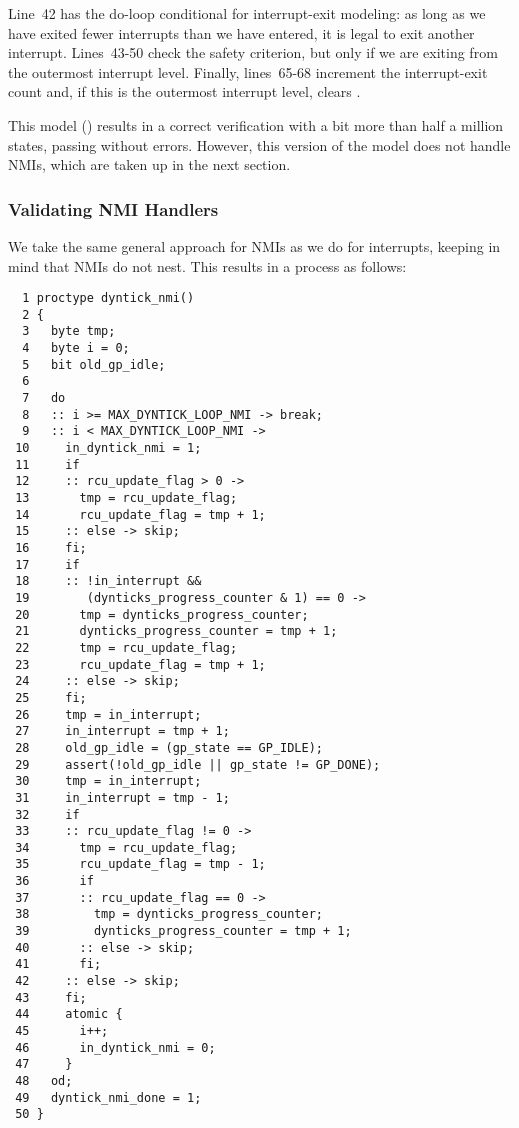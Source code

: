 Line~42 has the do-loop conditional for interrupt-exit modeling:
as long as we have exited fewer interrupts than we have entered, it is
legal to exit another interrupt.
Lines~43-50 check the safety criterion, but only if we are exiting
from the outermost interrupt level.
Finally, lines~65-68 increment the interrupt-exit count 
and, if this is the outermost interrupt level, clears
.

This model ()
results in a correct verification with a bit more than half a million
states, passing without errors.
However, this version of the model does not handle NMIs,
which are taken up in the next section.

\subsubsection{Validating NMI Handlers}
\label{sec:formal:Validating NMI Handlers}

We take the same general approach for NMIs as we do for interrupts,
keeping in mind that NMIs do not nest.
This results in a  process as follows:

{ \scriptsize
\begin{verbatim}
  1 proctype dyntick_nmi()
  2 {
  3   byte tmp;
  4   byte i = 0;
  5   bit old_gp_idle;
  6
  7   do
  8   :: i >= MAX_DYNTICK_LOOP_NMI -> break;
  9   :: i < MAX_DYNTICK_LOOP_NMI ->
 10     in_dyntick_nmi = 1;
 11     if
 12     :: rcu_update_flag > 0 ->
 13       tmp = rcu_update_flag;
 14       rcu_update_flag = tmp + 1;
 15     :: else -> skip;
 16     fi;
 17     if
 18     :: !in_interrupt &&
 19        (dynticks_progress_counter & 1) == 0 ->
 20       tmp = dynticks_progress_counter;
 21       dynticks_progress_counter = tmp + 1;
 22       tmp = rcu_update_flag;
 23       rcu_update_flag = tmp + 1;
 24     :: else -> skip;
 25     fi;
 26     tmp = in_interrupt;
 27     in_interrupt = tmp + 1;
 28     old_gp_idle = (gp_state == GP_IDLE);
 29     assert(!old_gp_idle || gp_state != GP_DONE);
 30     tmp = in_interrupt;
 31     in_interrupt = tmp - 1;
 32     if
 33     :: rcu_update_flag != 0 ->
 34       tmp = rcu_update_flag;
 35       rcu_update_flag = tmp - 1;
 36       if
 37       :: rcu_update_flag == 0 ->
 38         tmp = dynticks_progress_counter;
 39         dynticks_progress_counter = tmp + 1;
 40       :: else -> skip;
 41       fi;
 42     :: else -> skip;
 43     fi;
 44     atomic {
 45       i++;
 46       in_dyntick_nmi = 0;
 47     }
 48   od;
 49   dyntick_nmi_done = 1;
 50 }
\end{verbatim}
}

